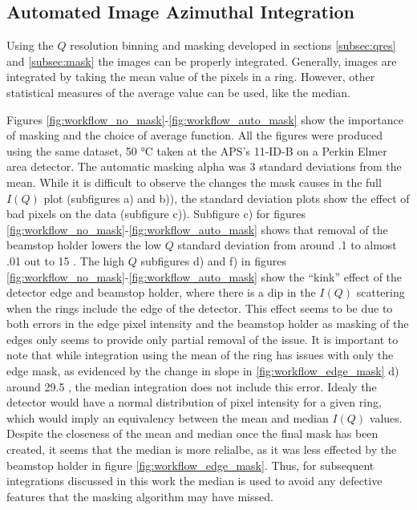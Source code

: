 \subsection{Automated Image Azimuthal Integration} \label{subsec:int}
Using the $Q$ resolution binning and masking developed in sections \ref{subsec:qres} and \ref{subsec:mask} the images can be properly integrated.
Generally, images are integrated by taking the mean value of the pixels in a ring.
However, other statistical measures of the average value can be used, like the median.

Figures \ref{fig:workflow_no_mask}-\ref{fig:workflow_auto_mask} show the importance of masking and the choice of average function.
All the figures were produced using the same dataset, 50 \si{\degree}C  taken at the APS's 11-ID-B on a Perkin Elmer area detector.
The automatic masking alpha was $3$ standard deviations from the mean.
While it is difficult to observe the changes the mask causes in the full $I(Q)$ plot (subfigures a) and b)), the standard deviation plots show the effect of bad pixels on the data (subfigure c)).
Subfigure c) for figures \ref{fig:workflow_no_mask}-\ref{fig:workflow_auto_mask} shows that removal of the beamstop holder lowers the low $Q$ standard deviation from around .1 to almost .01 out to 15 \iA.
The high $Q$ subfigures d) and f) in figures \ref{fig:workflow_no_mask}-\ref{fig:workflow_auto_mask} show the ``kink'' effect of the detector edge and beamstop holder, where there is a dip in the $I(Q)$ scattering when the rings include the edge of the detector.
This effect seems to be due to both errors in the edge pixel intensity and the beamstop holder as masking of the edges only seems to provide only partial removal of the issue.
It is important to note that while integration using the mean of the ring has issues with only the edge mask, as evidenced by the change in slope in \ref{fig:workflow_edge_mask} d) around 29.5 \iA, the median integration does not include this error.
Idealy the detector would have a normal distribution of pixel intensity for a given ring, which would imply an equivalency between the mean and median $I(Q)$ values.
Despite the closeness of the mean and median once the final mask has been created, it seems that the median is more relialbe, as it was less effected by the beamstop holder in figure \ref{fig:workflow_edge_mask}.
Thus, for subsequent integrations discussed in this work the median is used to avoid any defective features that the masking algorithm may have missed.

